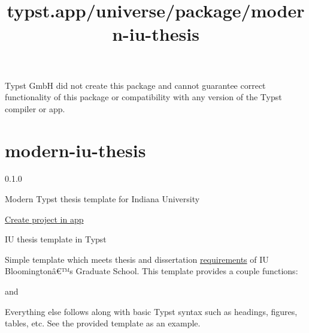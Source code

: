 Typst GmbH did not create this package and cannot guarantee correct
functionality of this package or compatibility with any version of the
Typst compiler or app.


\title{typst.app/universe/package/modern-iu-thesis}

\label{banner}
\label{template-thumbnail}

\section{modern-iu-thesis}\label{modern-iu-thesis}

{ 0.1.0 }

Modern Typst thesis template for Indiana University

\href{/app?template=modern-iu-thesis&version=0.1.0}{Create project in
app}

\label{readme}
IU thesis template in Typst

Simple template which meets thesis and dissertation
\href{https://graduate.indiana.edu/academic-requirements/thesis-dissertation/index.html}{requirements}
of IU Bloomingtonâ€™s Graduate School. This template provides a couple
functions:

\begin{Shaded}
\begin{Highlighting}[]
\NormalTok{        (}
\NormalTok{        ),}
\NormalTok{    ),}
\NormalTok{)}
\end{Highlighting}
\end{Shaded}

and

\begin{Shaded}
\begin{Highlighting}[]
\end{Highlighting}
\end{Shaded}

Everything else follows along with basic Typst syntax such as headings,
figures, tables, etc. See the provided template as an example.


